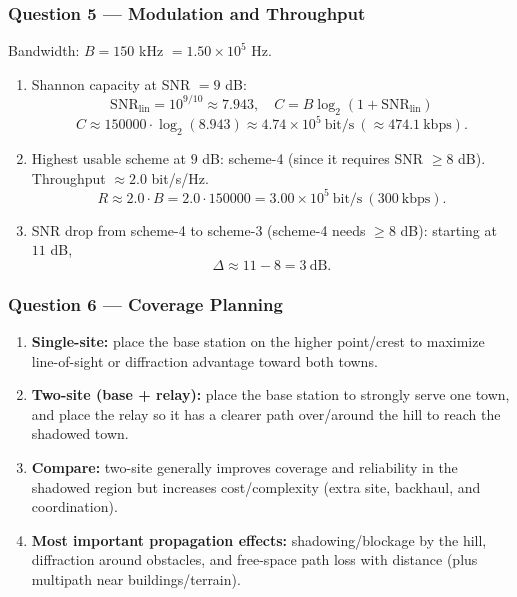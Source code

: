 \documentclass[11pt,a4paper]{article}
\begin{document}
\subsubsection*{Question 5 --- Modulation and Throughput}
Bandwidth: $B=150$ kHz $=1.50\times 10^5$ Hz.

\begin{enumerate}[label=\alph*.]
    \item Shannon capacity at SNR $=9$ dB:
    \[
    \mathrm{SNR}_{\text{lin}}=10^{9/10}\approx 7.943,\quad
    C=B\log_2(1+\mathrm{SNR}_{\text{lin}})
    \]
    \[
    C\approx 150000\cdot \log_2(8.943)\approx 4.74\times 10^5\ \text{bit/s}\ (\approx 474.1\ \text{kbps}).
    \]
    \item Highest usable scheme at $9$ dB: scheme-4 (since it requires SNR $\ge 8$ dB). Throughput $\approx 2.0$ bit/s/Hz.
    \[
    R\approx 2.0\cdot B=2.0\cdot 150000=3.00\times 10^5\ \text{bit/s}\ (300\ \text{kbps}).
    \]
    \item SNR drop from scheme-4 to scheme-3 (scheme-4 needs $\ge 8$ dB): starting at $11$ dB,
    \[
    \Delta \approx 11-8=3\ \text{dB}.
    \]
\end{enumerate}

\subsubsection*{Question 6 --- Coverage Planning}
\begin{enumerate}[label=\alph*.]
    \item \textbf{Single-site:} place the base station on the higher point/crest to maximize line-of-sight or diffraction advantage toward both towns.
    \item \textbf{Two-site (base + relay):} place the base station to strongly serve one town, and place the relay so it has a clearer path over/around the hill to reach the shadowed town.
    \item \textbf{Compare:} two-site generally improves coverage and reliability in the shadowed region but increases cost/complexity (extra site, backhaul, and coordination).
    \item \textbf{Most important propagation effects:} shadowing/blockage by the hill, diffraction around obstacles, and free-space path loss with distance (plus multipath near buildings/terrain).
\end{enumerate}
\end{document}
